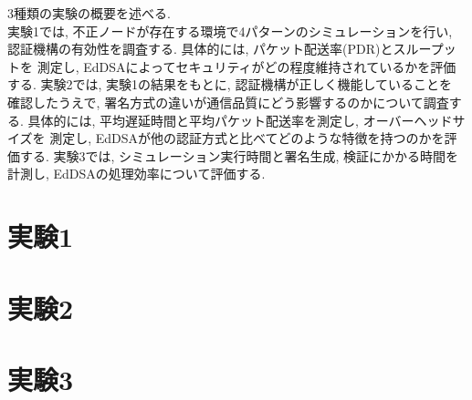 \indent 3種類の実験の概要を述べる.\\
\indent 実験1では, 不正ノードが存在する環境で4パターンのシミュレーションを行い, 
認証機構の有効性を調査する. 具体的には, パケット配送率(PDR)とスループットを
測定し, EdDSAによってセキュリティがどの程度維持されているかを評価する. 
実験2では, 実験1の結果をもとに, 認証機構が正しく機能していることを
確認したうえで, 署名方式の違いが通信品質にどう影響するのかについて調査する. 
具体的には, 平均遅延時間と平均パケット配送率を測定し, オーバーヘッドサイズを
測定し, EdDSAが他の認証方式と比べてどのような特徴を持つのかを評価する.
実験3では, シミュレーション実行時間と署名生成, 検証にかかる時間を計測し, 
EdDSAの処理効率について評価する. \\



\section{実験1}

\section{実験2}

\section{実験3}
